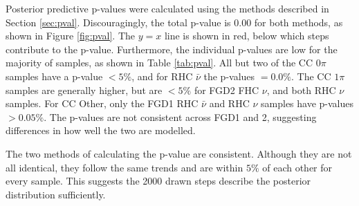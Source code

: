Posterior predictive p-values were calculated using the methods described in Section \ref{sec:pval}. Discouragingly, the total p-value is 0.00 for both methods, as shown in Figure \ref{fig:pval}. The $y=x$ line is shown in red, below which steps contribute to the p-value. Furthermore, the individual p-values are low for the majority of samples, as shown in Table \ref{tab:pval}. All but two of the CC 0$\pi$ samples have a p-value $<5\%$, and for RHC $\bar{\nu}$ the p-values $=0.0\%$. The CC $1\pi$ samples are generally higher, but are $<5\%$ for FGD2 FHC $\nu$, and both RHC $\nu$ samples. For CC Other, only the FGD1 RHC $\bar{\nu}$ and RHC $\nu$ samples have p-values $>0.05\%$. The p-values are not consistent across FGD1 and 2, suggesting differences in how well the two are modelled.

The two methods of calculating the p-value are consistent. Although they are not all identical, they follow the same trends and are within $5\%$ of each other for every sample. This suggests the 2000 drawn steps describe the posterior distribution sufficiently.

